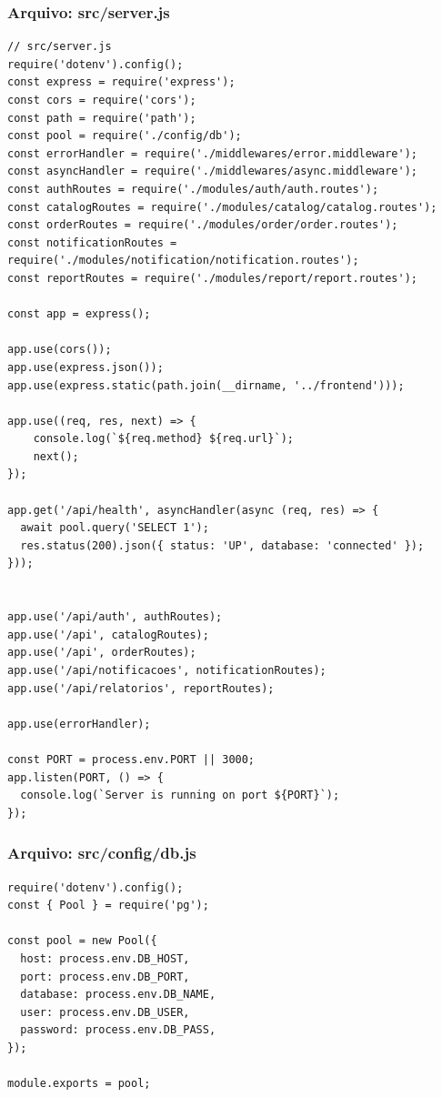 \subsubsection*{Arquivo: src/server.js}
\begin{lstlisting}[caption={src/server.js}]
// src/server.js
require('dotenv').config();
const express = require('express');
const cors = require('cors');
const path = require('path');
const pool = require('./config/db');
const errorHandler = require('./middlewares/error.middleware');
const asyncHandler = require('./middlewares/async.middleware');
const authRoutes = require('./modules/auth/auth.routes');
const catalogRoutes = require('./modules/catalog/catalog.routes');
const orderRoutes = require('./modules/order/order.routes');
const notificationRoutes = require('./modules/notification/notification.routes');
const reportRoutes = require('./modules/report/report.routes');

const app = express();

app.use(cors());
app.use(express.json());
app.use(express.static(path.join(__dirname, '../frontend')));

app.use((req, res, next) => {
    console.log(`${req.method} ${req.url}`);
    next();
});

app.get('/api/health', asyncHandler(async (req, res) => {
  await pool.query('SELECT 1');
  res.status(200).json({ status: 'UP', database: 'connected' });
}));


app.use('/api/auth', authRoutes);
app.use('/api', catalogRoutes);
app.use('/api', orderRoutes);
app.use('/api/notificacoes', notificationRoutes);
app.use('/api/relatorios', reportRoutes);

app.use(errorHandler);

const PORT = process.env.PORT || 3000;
app.listen(PORT, () => {
  console.log(`Server is running on port ${PORT}`);
});\end{lstlisting}
\vspace{0.5cm}
\subsubsection*{Arquivo: src/config/db.js}
\begin{lstlisting}[caption={src/config/db.js}]
require('dotenv').config();
const { Pool } = require('pg');

const pool = new Pool({
  host: process.env.DB_HOST,
  port: process.env.DB_PORT,
  database: process.env.DB_NAME,
  user: process.env.DB_USER,
  password: process.env.DB_PASS,
});

module.exports = pool;
\end{lstlisting}
\vspace{0.5cm}
